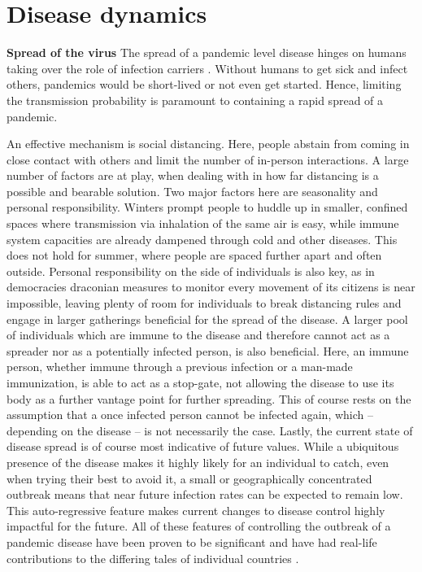 \documentclass[]{article}
\begin{document}
\section{Disease dynamics}
\textbf{Spread of the virus}\newline
The spread of a pandemic level disease hinges on humans taking over the role of infection carriers \cite{fang2020transmission}. Without humans to get sick and infect others, pandemics would be short-lived or not even get started. Hence, limiting the transmission probability is paramount to containing a rapid spread of a pandemic. 

An effective mechanism is social distancing. Here, people abstain from coming in close contact with others and limit the number of in-person interactions. A large number of factors are at play, when dealing with in how far distancing is a possible and bearable solution. Two major factors here are seasonality and personal responsibility. Winters prompt people to huddle up in smaller, confined spaces where transmission via inhalation of the same air is easy, while immune system capacities are already dampened through cold and other diseases. This does not hold for summer, where people are spaced further apart and often outside. Personal responsibility on the side of individuals is also key, as in democracies draconian measures to monitor every movement of its citizens is near impossible, leaving plenty of room for individuals to break distancing rules and engage in larger gatherings beneficial for the spread of the disease.\newline 
A larger pool of individuals which are immune to the disease and therefore cannot act as a spreader nor as a potentially infected person, is also beneficial. Here, an immune person, whether immune through a previous infection or a man-made immunization, is able to act as a stop-gate, not allowing the disease to use its body as a further vantage point for further spreading. This of course rests on the assumption that a once infected person cannot be infected again, which -- depending on the disease -- is not necessarily the case.\newline 
Lastly, the current state of disease spread is of course most indicative of future values. While a ubiquitous presence of the disease makes it highly likely for an individual to catch, even when trying their best to avoid it, a small or geographically concentrated outbreak means that near future infection rates can be expected to remain low. This auto-regressive feature makes current changes to disease control highly impactful for the future. \newline
All of these features of controlling the outbreak of a pandemic disease have been proven to be significant and have had real-life contributions to the differing tales of individual countries \cite{fanelli2020analysis}. 
\end{document}

